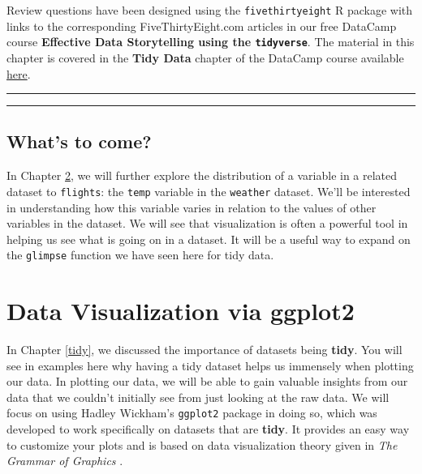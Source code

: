 \documentclass[]{tufte-book}
\let\oldrule=\rule
\renewcommand{\rule}[1]{\oldrule{\linewidth}}
\begin{document}
Review questions have been designed using the \texttt{fivethirtyeight} R
package \citep{R-fivethirtyeight} with links to the corresponding
FiveThirtyEight.com articles in our free DataCamp course
\textbf{Effective Data Storytelling using the \texttt{tidyverse}}. The
material in this chapter is covered in the \textbf{Tidy Data} chapter of
the DataCamp course available
\href{https://campus.datacamp.com/courses/effective-data-storytelling-using-the-tidyverse/tidy-data}{here}.

\begin{center}\rule{0.5\linewidth}{\linethickness}\end{center}

\begin{center}\rule{0.5\linewidth}{\linethickness}\end{center}

\section{What's to come?}\label{whats-to-come}

In Chapter \ref{viz}, we will further explore the distribution of a
variable in a related dataset to \texttt{flights}: the \texttt{temp}
variable in the \texttt{weather} dataset. We'll be interested in
understanding how this variable varies in relation to the values of
other variables in the dataset. We will see that visualization is often
a powerful tool in helping us see what is going on in a dataset. It will
be a useful way to expand on the \texttt{glimpse} function we have seen
here for tidy data.

\chapter{Data Visualization via ggplot2}\label{viz}

In Chapter \ref{tidy}, we discussed the importance of datasets being
\textbf{tidy}. You will see in examples here why having a tidy dataset
helps us immensely when plotting our data. In plotting our data, we will
be able to gain valuable insights from our data that we couldn't
initially see from just looking at the raw data. We will focus on using
Hadley Wickham's \texttt{ggplot2} package in doing so, which was
developed to work specifically on datasets that are \textbf{tidy}. It
provides an easy way to customize your plots and is based on data
visualization theory given in \emph{The Grammar of Graphics}
\citep{wilkinson2005}.
\end{document}
